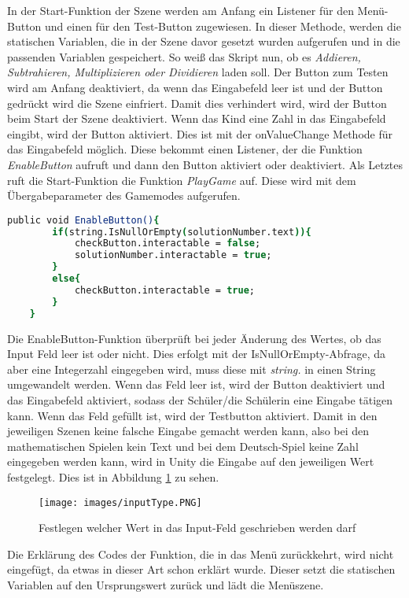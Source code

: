 In der Start-Funktion der Szene werden am Anfang ein Listener für den Menü-Button und einen für den Test-Button zugewiesen. In dieser Methode, werden die statischen Variablen, die in der Szene davor gesetzt wurden aufgerufen und in die passenden Variablen gespeichert.
So weiß das Skript nun, ob es \textit{Addieren, Subtrahieren, Multiplizieren oder Dividieren} laden soll. Der Button zum Testen wird am Anfang deaktiviert, da wenn das Eingabefeld leer ist und der Button gedrückt wird die Szene einfriert. Damit dies verhindert wird, wird der Button beim Start der Szene deaktiviert. Wenn das Kind eine Zahl in das Eingabefeld eingibt, wird der Button aktiviert. Dies ist mit der onValueChange Methode für das Eingabefeld möglich. Diese bekommt einen Listener, der die Funktion \textit{EnableButton} aufruft und dann den Button aktiviert oder deaktiviert. Als Letztes ruft die Start-Funktion die Funktion \textit{PlayGame} auf. Diese wird mit dem Übergabeparameter des Gamemodes aufgerufen.\\
\begin{lstlisting}[language=csh, caption={MathOperations.cs EnableButton-Funktion}]
	public void EnableButton(){
		if(string.IsNullOrEmpty(solutionNumber.text)){
			checkButton.interactable = false;
			solutionNumber.interactable = true;
		}
		else{
			checkButton.interactable = true;
		}
	}
\end{lstlisting}
Die EnableButton-Funktion überprüft bei jeder Änderung des Wertes, ob das Input Feld leer ist oder nicht. Dies erfolgt mit der IsNullOrEmpty-Abfrage, da aber eine Integerzahl eingegeben wird, muss diese mit \textit{string.} in einen String umgewandelt werden. Wenn das Feld leer ist, wird der Button deaktiviert und das Eingabefeld aktiviert, sodass der Schüler/die Schülerin eine Eingabe tätigen kann. Wenn das Feld gefüllt ist, wird der Testbutton aktiviert. Damit in den jeweiligen Szenen keine falsche Eingabe gemacht werden kann, also bei den mathematischen Spielen kein Text und bei dem Deutsch-Spiel keine Zahl eingegeben werden kann, wird in Unity die Eingabe auf den jeweiligen Wert festgelegt. Dies ist in Abbildung \ref{inputField} zu sehen.
\begin{figure}[htbp]
  \centering
  \texttt{[image: images/inputType.PNG]}
  \caption{Festlegen welcher Wert in das Input-Feld geschrieben werden darf}
  \label{inputField}
\end{figure}
Die Erklärung des Codes der Funktion, die in das Menü zurückkehrt, wird nicht eingefügt, da etwas in dieser Art schon erklärt wurde. Dieser setzt die statischen Variablen auf den Ursprungswert zurück und lädt die Menüszene.\\
